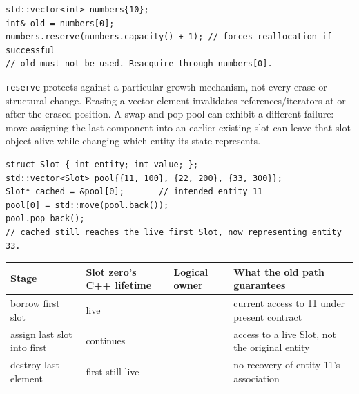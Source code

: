 \begin{verbatim}
std::vector<int> numbers{10};
int& old = numbers[0];
numbers.reserve(numbers.capacity() + 1); // forces reallocation if successful
// old must not be used. Reacquire through numbers[0].
\end{verbatim}

\texttt{reserve} protects against a particular growth mechanism, not every erase or structural change. Erasing a vector element invalidates references/iterators at or after the erased position. A swap-and-pop pool can exhibit a different failure: move-assigning the last component into an earlier existing slot can leave that slot object alive while changing which entity its state represents.

\begin{verbatim}
struct Slot { int entity; int value; };
std::vector<Slot> pool{{11, 100}, {22, 200}, {33, 300}};
Slot* cached = &pool[0];       // intended entity 11
pool[0] = std::move(pool.back());
pool.pop_back();
// cached still reaches the live first Slot, now representing entity 33.
\end{verbatim}

{\def\LTcaptype{none} %
\begin{longtable}[]{@{}
  >{\raggedright\arraybackslash}p{}
  >{\raggedright\arraybackslash}p{}
  >{\raggedright\arraybackslash}p{}
  >{\raggedright\arraybackslash}p{}@{}}
\toprule\noalign{}
\begin{minipage}[b]{\linewidth}\raggedright
Stage
\end{minipage} & \begin{minipage}[b]{\linewidth}\raggedright
Slot zero's C++ lifetime
\end{minipage} & \begin{minipage}[b]{\linewidth}\raggedright
Logical owner
\end{minipage} & \begin{minipage}[b]{\linewidth}\raggedright
What the old path guarantees
\end{minipage} \\
\midrule\noalign{}
\endhead
\bottomrule\noalign{}
\endlastfoot
borrow first slot & live & 11 & current access to 11 under present contract \\
assign last slot into first & continues & 33 & access to a live Slot, not the original entity \\
destroy last element & first still live & 33 & no recovery of entity 11's association \\
\end{longtable}
}

